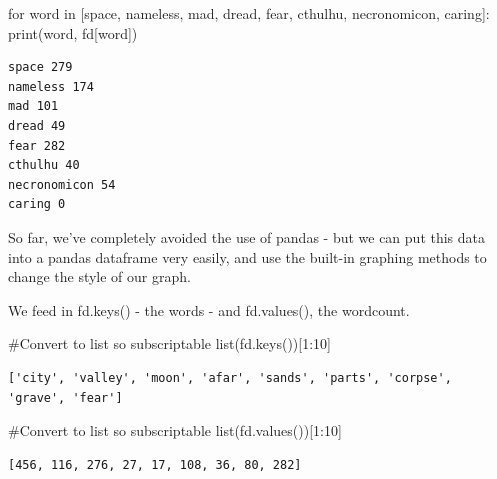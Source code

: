\documentclass[
  letterpaper,
  DIV=11,
  numbers=noendperiod]{scrreprt}
\newenvironment{Shaded}{\begin{snugshade}}{\end{snugshade}}
\newcommand{\BuiltInTok}[1]{\textcolor[rgb]{0.00,0.23,0.31}{#1}}
\newcommand{\CommentTok}[1]{\textcolor[rgb]{0.37,0.37,0.37}{#1}}
\newcommand{\ControlFlowTok}[1]{\textcolor[rgb]{0.00,0.23,0.31}{#1}}
\newcommand{\DecValTok}[1]{\textcolor[rgb]{0.68,0.00,0.00}{#1}}
\newcommand{\KeywordTok}[1]{\textcolor[rgb]{0.00,0.23,0.31}{#1}}
\newcommand{\NormalTok}[1]{\textcolor[rgb]{0.00,0.23,0.31}{#1}}
\newcommand{\StringTok}[1]{\textcolor[rgb]{0.13,0.47,0.30}{#1}}
\begin{document}
\begin{Shaded}
\begin{Highlighting}[]
\ControlFlowTok{for}\NormalTok{ word }\KeywordTok{in}\NormalTok{ [}\StringTok{\textquotesingle{}space\textquotesingle{}}\NormalTok{, }\StringTok{\textquotesingle{}nameless\textquotesingle{}}\NormalTok{, }\StringTok{\textquotesingle{}mad\textquotesingle{}}\NormalTok{, }\StringTok{\textquotesingle{}dread\textquotesingle{}}\NormalTok{, }\StringTok{\textquotesingle{}fear\textquotesingle{}}\NormalTok{, }\StringTok{\textquotesingle{}cthulhu\textquotesingle{}}\NormalTok{, }\StringTok{\textquotesingle{}necronomicon\textquotesingle{}}\NormalTok{, }\StringTok{\textquotesingle{}caring\textquotesingle{}}\NormalTok{]:}
    \BuiltInTok{print}\NormalTok{(word, fd[word])}
\end{Highlighting}
\end{Shaded}

\begin{verbatim}
space 279
nameless 174
mad 101
dread 49
fear 282
cthulhu 40
necronomicon 54
caring 0
\end{verbatim}

So far, we've completely avoided the use of pandas - but we can put this
data into a pandas dataframe very easily, and use the built-in graphing
methods to change the style of our graph.

We feed in fd.keys() - the words - and fd.values(), the wordcount.

\begin{Shaded}
\begin{Highlighting}[]
\CommentTok{\#Convert to list so subscriptable}
\BuiltInTok{list}\NormalTok{(fd.keys())[}\DecValTok{1}\NormalTok{:}\DecValTok{10}\NormalTok{]}
\end{Highlighting}
\end{Shaded}

\begin{verbatim}
['city', 'valley', 'moon', 'afar', 'sands', 'parts', 'corpse', 'grave', 'fear']
\end{verbatim}

\begin{Shaded}
\begin{Highlighting}[]
\CommentTok{\#Convert to list so subscriptable}
\BuiltInTok{list}\NormalTok{(fd.values())[}\DecValTok{1}\NormalTok{:}\DecValTok{10}\NormalTok{]}
\end{Highlighting}
\end{Shaded}

\begin{verbatim}
[456, 116, 276, 27, 17, 108, 36, 80, 282]
\end{verbatim}
\end{document}
